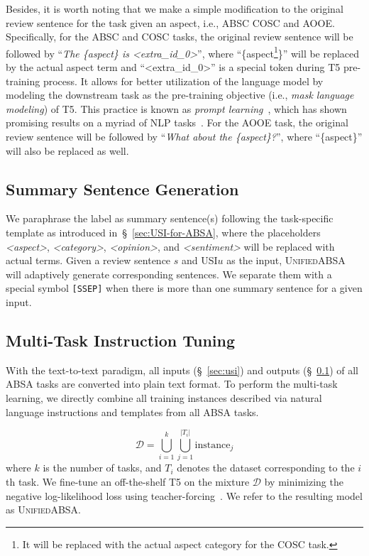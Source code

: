 \documentclass[11pt]{article}
\newcommand{\UnifiedABSA}{\textsc{UnifiedABSA}\xspace}
\newcommand{\USI}{\textsc{USI}\xspace}
\begin{document}
Besides, it is worth noting that we make a simple modification to the original review sentence for the task given an aspect, i.e., ABSC COSC and AOOE. Specifically, for the ABSC and COSC tasks, the original review sentence will be followed by ``\emph{The \{aspect\} is <extra\_id\_0>}'', where ``\{aspect\footnote{It will be replaced with the actual aspect category for the COSC task.}\}'' will be replaced by the actual aspect term and ``<extra\_id\_0>'' is a special token during T5 pre-training process. It allows for better utilization of the language model by modeling the downstream task as the pre-training objective (i.e., \emph{mask language modeling}) of T5. This practice is known as \emph{prompt learning}~\citep{liu2021prompt-survey}, which has shown promising results on a myriad of NLP tasks~\citep{schick-schutze-2021-few-shot-generation,schick-schutze-2021-just,gao-etal-2021lm-bff}. For the AOOE task, the original review sentence will be followed by ``\emph{What about the \{aspect\}?}'', where ``\{aspect\}'' will also be replaced as well.


\subsection{Summary Sentence Generation}
\label{sec:summary-sentence-generation}


We paraphrase the label as summary sentence(s) following the task-specific template as introduced in~\S~\ref{sec:USI-for-ABSA}, where the placeholders \emph{<aspect>}, \emph{<category>}, \emph{<opinion>}, and \emph{<sentiment>} will be replaced with actual terms. Given a review sentence $s$ and \USI $u$ as the input, \UnifiedABSA will adaptively generate corresponding sentences. We separate them with a special symbol \texttt{[SSEP]} when there is more than one summary sentence for a given input.


\subsection{Multi-Task Instruction Tuning}
\label{sec:multi-task-instuction-tuning}

With the text-to-text paradigm, all inputs (\S~\ref{sec:usi}) and outputs (\S~\ref{sec:summary-sentence-generation}) of all ABSA tasks are converted into plain text format. To perform the multi-task learning, we directly combine all training instances described via natural language instructions and templates from all ABSA tasks. 

\vspace{-0.1cm}
\begin{equation}
    \mathcal{D} = \bigcup_{i=1}^{k} \bigcup_{j=1}^{|T_i|} \text{instance}_j
\end{equation}
where $k$ is the number of tasks, and $T_i$ denotes the dataset corresponding to the $i$ th task. We fine-tune an off-the-shelf T5 on the mixture $\mathcal{D}$ by minimizing the negative log-likelihood loss using teacher-forcing~\citep{DBLP:journals/neco/WilliamsZ89}.  We refer to the resulting model as \UnifiedABSA.
\end{document}
